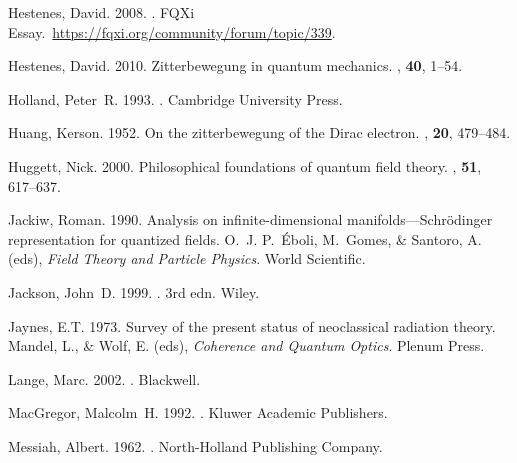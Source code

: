 \documentclass[12pt,secnumarabic,amsmath,amssymb,balancelastpage,nofootinbib]{article}
\begin{document}
\begin{thebibliography}{}
Hestenes, David. 2008.
.
\newblock FQXi Essay.\ \url{https://fqxi.org/community/forum/topic/339}.

Hestenes, David. 2010.
\newblock Zitterbewegung in quantum mechanics.
, {\bf 40}, 1--54.

Holland, Peter~R. 1993.
.
\newblock Cambridge University Press.

Huang, Kerson. 1952.
\newblock On the zitterbewegung of the Dirac electron.
, {\bf 20}, 479--484.

Huggett, Nick. 2000.
\newblock Philosophical foundations of quantum field theory.
, {\bf 51},
  617--637.

Jackiw, Roman. 1990.
\newblock Analysis on infinite-dimensional manifolds---Schr\"{o}dinger
  representation for quantized fields.
 O.~J. P.~\'{E}boli, M.~Gomes, \& Santoro, A.
  (eds), {\em Field Theory and Particle Physics}.
\newblock World Scientific.

Jackson, John~D. 1999.
. 3rd edn.
\newblock Wiley.

Jaynes, E.T. 1973.
\newblock Survey of the present status of neoclassical radiation theory.
 Mandel, L., \& Wolf, E. (eds), {\em Coherence
  and Quantum Optics}.
\newblock Plenum Press.

Lange, Marc. 2002.
.
\newblock Blackwell.

MacGregor, Malcolm~H. 1992.
.
\newblock Kluwer Academic Publishers.

Messiah, Albert. 1962.
.
\newblock North-Holland Publishing Company.


\end{thebibliography}
\end{document}
